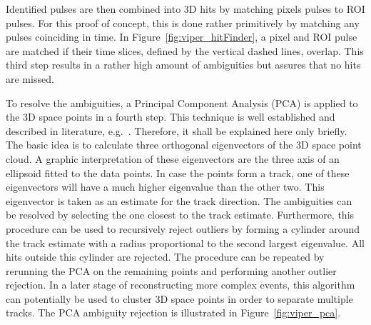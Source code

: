 Identified pulses are then combined into 3D hits by matching pixels pulses to ROI pulses.
For this proof of concept, this is done rather primitively by matching any pulses coinciding in time.
In Figure~\ref{fig:viper_hitFinder}, a pixel and ROI pulse are matched if their time slices, defined by the vertical dashed lines, overlap.
This third step results in a rather high amount of ambiguities but assures that no hits are missed.

To resolve the ambiguities, a Principal Component Analysis (PCA) is applied to the 3D space points in a fourth step.
This technique is well established and described in literature, e.g.~\cite{pca}.
Therefore, it shall be explained here only briefly.
The basic idea is to calculate three orthogonal eigenvectors of the 3D space point cloud.
A graphic interpretation of these eigenvectors are the three axis of an ellipsoid fitted to the data points.
In case the points form a track, one of these eigenvectors will have a much higher eigenvalue than the other two.
This eigenvector is taken as an estimate for the track direction.
The ambiguities can be resolved by selecting the one closest to the track estimate.
Furthermore, this procedure can be used to recursively reject outliers by forming a cylinder around the track estimate with a radius proportional to the second largest eigenvalue.
All hits outside this cylinder are rejected.
The procedure can be repeated by rerunning the PCA on the remaining points and performing another outlier rejection.
In a later stage of reconstructing more complex events, this algorithm can potentially be used to cluster 3D space points in order to separate multiple tracks.
The PCA ambiguity rejection is illustrated in Figure~\ref{fig:viper_pca}.

